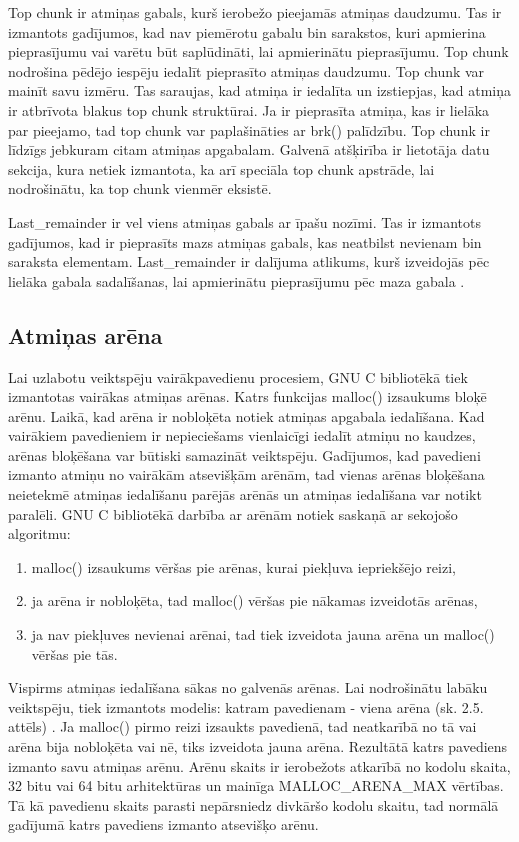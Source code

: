 Top chunk ir atmiņas gabals, kurš ierobežo pieejamās atmiņas daudzumu.
Tas ir izmantots gadījumos, kad nav piemērotu gabalu bin sarakstos, kuri apmierina pieprasījumu vai varētu būt saplūdināti, lai apmierinātu pieprasījumu.
Top chunk nodrošina pēdējo iespēju iedalīt pieprasīto atmiņas daudzumu.
Top chunk var mainīt savu izmēru. Tas saraujas, kad atmiņa ir iedalīta un izstiepjas, kad atmiņa ir atbrīvota blakus top chunk struktūrai. 
Ja ir pieprasīta atmiņa, kas ir lielāka par pieejamo, tad top chunk var paplašināties ar brk() palīdzību.
Top chunk ir līdzīgs jebkuram citam atmiņas apgabalam. 
Galvenā atšķirība ir lietotāja datu sekcija, kura netiek izmantota, ka arī speciāla top chunk apstrāde, lai nodrošinātu, ka top chunk vienmēr eksistē.

Last\_remainder ir vel viens atmiņas gabals ar īpašu nozīmi.
Tas ir izmantots gadījumos, kad ir pieprasīts mazs atmiņas gabals, kas neatbilst nevienam bin saraksta elementam. 
Last\_remainder ir dalījuma atlikums, kurš izveidojās pēc lielāka gabala sadalīšanas, lai apmierinātu pieprasījumu pēc maza gabala  \cite {BLACKHAT}.

\subsection{Atmiņas arēna}
Lai uzlabotu veiktspēju vairākpavedienu procesiem, GNU C bibliotēkā tiek izmantotas vairākas atmiņas arēnas. 
Katrs funkcijas malloc() izsaukums bloķē arēnu. Laikā, kad arēna ir nobloķēta notiek atmiņas apgabala iedalīšana.
Kad vairākiem pavedieniem ir nepieciešams vienlaicīgi iedalīt atmiņu no kaudzes, arēnas bloķēšana var būtiski samazināt veiktspēju.
Gadījumos, kad pavedieni izmanto atmiņu no vairākām atsevišķām arēnām, tad vienas arēnas bloķēšana neietekmē atmiņas iedalīšanu parējās arēnās un atmiņas iedalīšana var notikt paralēli.
GNU C bibliotēkā darbība ar arēnām notiek saskaņā ar sekojošo algoritmu: 

\begin{enumerate}
\item malloc() izsaukums vēršas pie arēnas, kurai piekļuva iepriekšējo reizi,
\item ja arēna ir nobloķēta, tad malloc() vēršas pie nākamas izveidotās arēnas,
\item ja nav piekļuves nevienai arēnai, tad tiek izveidota jauna arēna un malloc() vēršas pie tās.
\end{enumerate}

Vispirms atmiņas iedalīšana sākas no galvenās arēnas. 
Lai nodrošinātu labāku veiktspēju, tiek izmantots modelis: katram pavedienam - viena arēna (sk. 2.5. attēls) \cite{JCFVO}. 
Ja malloc() pirmo reizi izsaukts pavedienā, tad neatkarībā no tā vai arēna bija nobloķēta vai nē, tiks izveidota jauna arēna.
Rezultātā katrs pavediens izmanto savu atmiņas arēnu. 
Arēnu skaits ir ierobežots atkarībā no kodolu skaita, 32 bitu vai 64 bitu arhitektūras un mainīga MALLOC\_ARENA\_MAX vērtības.
Tā kā pavedienu skaits parasti nepārsniedz divkāršo kodolu skaitu, tad normālā gadījumā katrs pavediens izmanto atsevišķo arēnu. 

